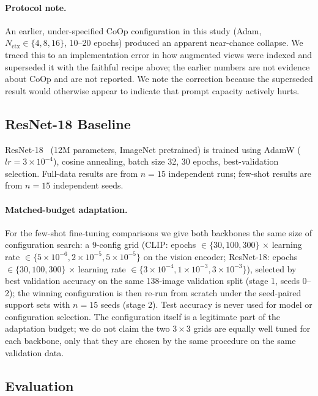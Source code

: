 \documentclass[10pt,a4paper]{article}
\begin{document}
\paragraph{Protocol note.} An earlier, under-specified CoOp configuration in this study (Adam, $N_{\mathrm{ctx}}\in\{4,8,16\}$, 10--20 epochs) produced an apparent near-chance collapse. We traced this to an implementation error in how augmented views were indexed and superseded it with the faithful recipe above; the earlier numbers are not evidence about CoOp and are not reported. We note the correction because the superseded result would otherwise appear to indicate that prompt capacity actively hurts.

\subsection{ResNet-18 Baseline}

ResNet-18~\cite{he2016deep} (12M parameters, ImageNet pretrained) is trained using AdamW ($lr=3\times10^{-4}$), cosine annealing, batch size 32, 30 epochs, best-validation selection.
Full-data results are from $n=15$ independent runs; few-shot results are from $n=15$ independent seeds.
\paragraph{Matched-budget adaptation.} For the few-shot fine-tuning comparisons we give both backbones the same size of configuration search: a 9-config grid (CLIP: epochs $\in\{30,100,300\}$ $\times$ learning rate $\in\{5\times10^{-6},2\times10^{-5},5\times10^{-5}\}$ on the vision encoder; ResNet-18: epochs $\in\{30,100,300\}$ $\times$ learning rate $\in\{3\times10^{-4},1\times10^{-3},3\times10^{-3}\}$), selected by best validation accuracy on the same 138-image validation split (stage 1, seeds 0--2); the winning configuration is then re-run from scratch under the seed-paired support sets with $n=15$ seeds (stage 2). Test accuracy is never used for model or configuration selection. The configuration itself is a legitimate part of the adaptation budget; we do not claim the two $3\times3$ grids are equally well tuned for each backbone, only that they are chosen by the same procedure on the same validation data.

\subsection{Evaluation}
\end{document}
